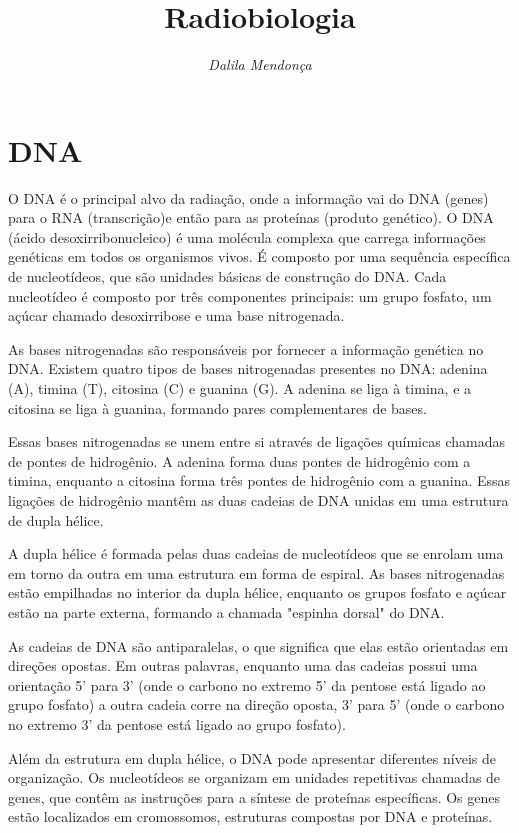 \documentclass[11pt,a4paper]{article}
\title{\LobsterTwo\Huge{Radiobiologia}}
\author{\LobsterTwo{Biologia Molecular\nocite{*}}}
\date{\LobsterTwo\textit{Dalila Mendonça}}
\begin{document}
	\maketitle
  
\section{DNA}

	O DNA é o principal alvo da radiação, onde a informação vai do DNA (genes) para o RNA (transcrição)e então para as proteínas (produto genético). O DNA (ácido desoxirribonucleico) é uma molécula complexa que carrega informações genéticas em todos os organismos vivos. É composto por uma sequência específica de nucleotídeos, que são unidades básicas de construção do DNA. Cada nucleotídeo é composto por três componentes principais: um grupo fosfato, um açúcar chamado desoxirribose e uma base nitrogenada.

	As bases nitrogenadas são responsáveis por fornecer a informação genética no DNA. Existem quatro tipos de bases nitrogenadas presentes no DNA: adenina (A), timina (T), citosina (C) e guanina (G). A adenina se liga à timina, e a citosina se liga à guanina, formando pares complementares de bases.

	Essas bases nitrogenadas se unem entre si através de ligações químicas chamadas de pontes de hidrogênio. A adenina forma duas pontes de hidrogênio com a timina, enquanto a citosina forma três pontes de hidrogênio com a guanina. Essas ligações de hidrogênio mantêm as duas cadeias de DNA unidas em uma estrutura de dupla hélice.

	A dupla hélice é formada pelas duas cadeias de nucleotídeos que se enrolam uma em torno da outra em uma estrutura em forma de espiral. As bases nitrogenadas estão empilhadas no interior da dupla hélice, enquanto os grupos fosfato e açúcar estão na parte externa, formando a chamada "espinha dorsal" do DNA.
		
	As cadeias de DNA são antiparalelas, o que significa que elas estão orientadas em direções opostas.  Em outras palavras, enquanto uma das cadeias possui uma orientação 5' para 3' (onde o carbono no extremo 5' da pentose está ligado ao grupo fosfato) a outra cadeia corre na direção oposta, 3' para 5' (onde o carbono no extremo 3' da pentose está ligado ao grupo fosfato).

	Além da estrutura em dupla hélice, o DNA pode apresentar diferentes níveis de organização. Os nucleotídeos se organizam em unidades repetitivas chamadas de genes, que contêm as instruções para a síntese de proteínas específicas. Os genes estão localizados em cromossomos, estruturas compostas por DNA e proteínas.
\end{document}
